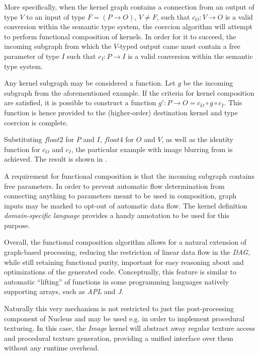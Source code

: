 More specifically, when the kernel graph contains a connection from an output of type $V$ to an input of type $F = (P \rightarrow O)$, $V \neq F$, such that $c_O : V \rightarrow O$ is a valid conversion within the semantic type system, the coercion algorithm will attempt to perform functional composition of kernels. In order for it to succeed, the incoming subgraph from which the $V$-typed output came must contain a free parameter of type $I$ such that $c_I : P \rightarrow I$ is a valid conversion within the semantic type system.

Any kernel subgraph may be considered a function. Let $g$ be the incoming subgraph from the aforementioned example. If the criteria for kernel composition are satisfied, it is possible to construct a function $g\prime : P \rightarrow O = c_O \circ g \circ c_I$. This function is hence provided to the (higher-order) destination kernel and type coercion is complete.

Substituting $float2$ for $P$ and $I$, $float4$ for $O$ and $V$, as well as the identity function for $c_O$ and $c_I$, the particular example with image blurring from  is achieved. The result is shown in .

A requirement for functional composition is that the incoming subgraph contains free parameters. In order to prevent automatic flow determination from connecting anything to parameters meant to be used in composition, graph inputs may be marked to opt-out of automatic data flow. The kernel definition \emph{domain-specific language} provides a handy annotation to be used for this purpose.


Overall, the functional composition algorithm allows for a natural extension of graph-based processing, reducing the restriction of linear data flow in the \emph{DAG}, while still retaining functional purity, important for easy reasoning about and optimizations of the generated code. Conceptually, this feature is similar to automatic ``lifting'' of functions in some programming languages natively supporting arrays, such as \emph{APL} and \emph{J}.

Naturally this very mechanism is not restricted to just the post-processing component of Nucleus and may be used e.g. in order to implement procedural texturing. In this case, the \emph{Image} kernel will abstract away regular texture access and procedural texture generation, providing a unified interface over them without any runtime overhead.
	
